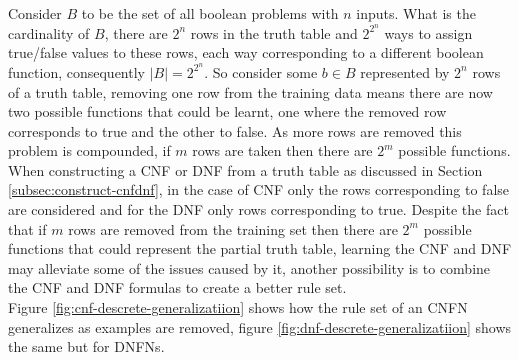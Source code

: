 Consider $B$ to be the set of all boolean problems with $n$ inputs. What is the cardinality of $B$, there are $2^n$ rows in the truth table and $2^{2^n}$ ways to assign true/false values to these rows, each way corresponding to a different boolean function, consequently $|B| = 2^{2^n}$. So consider some $b \in B$ represented by $2^n$ rows of a truth table, removing one row from the training data means there are now two possible functions that could be learnt, one where the removed row corresponds to true and the other to false. As more rows are removed this problem is compounded, if $m$ rows are taken then there are $2^m$ possible functions.\\

When constructing a CNF or DNF from a truth table as discussed in Section \ref{subsec:construct-cnfdnf}, in the case of CNF only the rows corresponding to false are considered and for the DNF only rows corresponding to true. Despite the fact that if $m$ rows are removed from the training set then there are $2^m$ possible functions that could represent the partial truth table, learning the CNF and DNF may alleviate some of the issues caused by it, another possibility is to combine the CNF and DNF formulas to create a better rule set.\\

Figure \ref{fig:cnf-descrete-generalizatiion} shows how the rule set of an CNFN generalizes as examples are removed, figure \ref{fig:dnf-descrete-generalizatiion} shows the same but for DNFNs.

